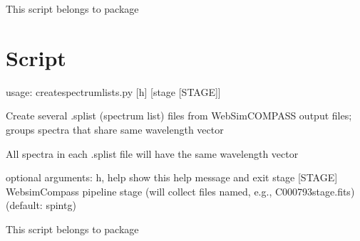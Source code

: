 \documentclass[letterpaper,10pt,english]{sphinxmanual}
\begin{document}
This script belongs to package 


\section{Script }
\label{\detokenize{autoscripts/script-create-spectrum-lists::doc}}\label{\detokenize{autoscripts/script-create-spectrum-lists:script-create-spectrum-lists-py}}
\begin{sphinxVerbatim}[commandchars=\\\{\}]
usage: create\PYGZhy{}spectrum\PYGZhy{}lists.py [\PYGZhy{}h] [\PYGZhy{}\PYGZhy{}stage [STAGE]]

Create several .splist (spectrum list) files from WebSim\PYGZhy{}COMPASS output files; groups spectra that share same wavelength vector

All spectra in each .splist file will have the same wavelength vector

optional arguments:
  \PYGZhy{}h, \PYGZhy{}\PYGZhy{}help       show this help message and exit
  \PYGZhy{}\PYGZhy{}stage [STAGE]  Websim\PYGZhy{}Compass pipeline stage (will collect files named,
                   e.g., C000793\PYGZus{}\PYGZlt{}stage\PYGZgt{}.fits) (default: spintg)
\end{sphinxVerbatim}

This script belongs to package 
\end{document}
